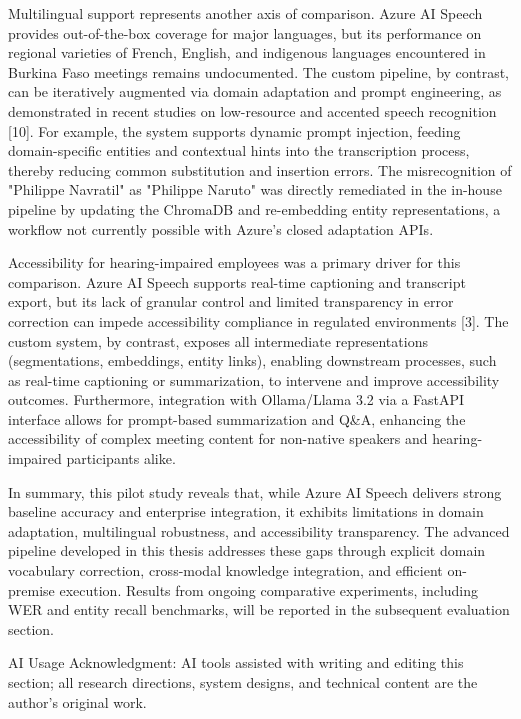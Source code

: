 \documentclass[12pt,a4paper]{article}
\begin{document}
Multilingual support represents another axis of comparison. Azure AI Speech provides out-of-the-box coverage for major languages, but its performance on regional varieties of French, English, and indigenous languages encountered in Burkina Faso meetings remains undocumented. The custom pipeline, by contrast, can be iteratively augmented via domain adaptation and prompt engineering, as demonstrated in recent studies on low-resource and accented speech recognition [10]. For example, the system supports dynamic prompt injection, feeding domain-specific entities and contextual hints into the transcription process, thereby reducing common substitution and insertion errors. The misrecognition of "Philippe Navratil" as "Philippe Naruto" was directly remediated in the in-house pipeline by updating the ChromaDB and re-embedding entity representations, a workflow not currently possible with Azure's closed adaptation APIs.


Accessibility for hearing-impaired employees was a primary driver for this comparison. Azure AI Speech supports real-time captioning and transcript export, but its lack of granular control and limited transparency in error correction can impede accessibility compliance in regulated environments [3]. The custom system, by contrast, exposes all intermediate representations (segmentations, embeddings, entity links), enabling downstream processes, such as real-time captioning or summarization, to intervene and improve accessibility outcomes. Furthermore, integration with Ollama/Llama 3.2 via a FastAPI interface allows for prompt-based summarization and Q\&A, enhancing the accessibility of complex meeting content for non-native speakers and hearing-impaired participants alike.


In summary, this pilot study reveals that, while Azure AI Speech delivers strong baseline accuracy and enterprise integration, it exhibits limitations in domain adaptation, multilingual robustness, and accessibility transparency. The advanced pipeline developed in this thesis addresses these gaps through explicit domain vocabulary correction, cross-modal knowledge integration, and efficient on-premise execution. Results from ongoing comparative experiments, including WER and entity recall benchmarks, will be reported in the subsequent evaluation section.


AI Usage Acknowledgment: AI tools assisted with writing and editing this section; all research directions, system designs, and technical content are the author's original work.
\end{document}
